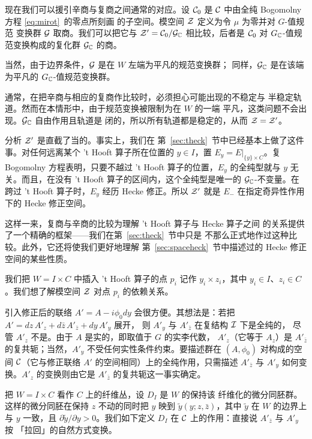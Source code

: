 现在我们可以援引辛商与复商之间通常的对应。设 ${\EUC}_0$ 是
${\EUC}$ 中由全纯 Bogomolny 方程 \eqref{eq:mirot}\ 的零点所刻画
的子空间。模空间 ${\EUZ}$ 定义为令 $\mu$ 为零并对 $G$-值规范
变换群 ${\cal G}$ 取商。我们可以把它与
${\EUZ}'={\EUC}_0/{\cal G}_{\Bbb{C}}$ 相比较，后者是 ${\EUC}_0$
对 $G_{\Bbb{C}}$-值规范变换构成的复化群
${\cal G}_{\Bbb{C}}$ 的商。

当然，由于边界条件，${\cal G}$ 是在 $W$ 左端为平凡的规范变换群；
同样，${\cal G}_{\Bbb{C}}$ 是在该端为平凡的
$G_{\Bbb{C}}$-值规范变换群。

通常，在把辛商与相应的复商作比较时，必须担心可能出现的不稳定与
半稳定轨道。然而在本情形中，由于规范变换被限制为在 $W$ 的一端
平凡，这类问题不会出现。${\cal G}_{\Bbb{C}}$ 自由作用且轨道是
闭的，所以所有轨道都是稳定的，从而 ${\EUZ}={\EUZ}'$。

分析 ${\EUZ}'$ 是直截了当的。事实上，我们在
第~\ref{sec:theck}~节中已经基本上做了这件事。对任何远离某个
't Hooft 算子所在位置的 $y\in I$，置
$E_y=E|_{ \{y\}\times C}$。复 Bogomolny 方程表明，只要不越过
't Hooft 算子的位置，$E_y$ 的全纯型就与 $y$ 无关。而且，在没有
't Hooft 算子的区间内，这个全纯型是唯一的
${\cal G}_{\Bbb{C}}$-不变量。在跨过 't Hooft 算子时，$E_y$ 经历
Hecke 修正。所以 ${\EUZ}'$ 就是 $E_-$ 在指定奇异性作用下的
Hecke 修正空间。

这样一来，复商与辛商的比较为理解 't Hooft 算子与 Hecke 算子之间
的关系提供了一个精确的框架——我们在第~\ref{sec:theck}~节中只是
不那么正式地作过这种比较。此外，它还将使我们更好地理解
第~\ref{sec:spaceheck}~节中描述过的 Hecke 修正空间的某些性质。

\par{}

我们把 $W=I\times C$ 中插入 't Hooft 算子的点 $p_i$ 记作
$y_i\times z_i$，其中 $y_i\in I$、$z_i\in C$。我们想了解模空间
${\EUZ}$ 对点 $p_i$ 的依赖关系。

引入修正后的联络 $A'=A-i\phi_0 dy$ 会很方便。其想法是：若把
$A'=dz\,A'_z+d\bar z \,A'_{\bar z} +dy\, A'_y$ 展开，
则 $A'{}_y$ 与 $A'{}_{\bar z}$ 在复结构 ${\cal I}$ 下是全纯的，
尽管 $A'_z$ 不是。由于 $A$ 是实的，即取值于 $G$ 的实李代数，
$A'_z$（它等于 $A_z$）是 $A'_{\bar z}$ 的复共轭；当然，$A'_y$
不受任何实性条件约束。要描述群在 $(A,\phi_0)$ 对构成的空间
${\EUC}$（它与修正联络 $A'$ 的空间相同）上的全纯作用，只需描述
$A'_{\bar z}$ 与 $A'_y$ 如何变换。$A'_z$ 的变换则由它是
$A'_{\bar z}$ 的复共轭这一事实确定。

把 $W=I\times C$ 看作 $C$ 上的纤维丛，设 $D_I$ 是 $W$ 的保持该
纤维化的微分同胚群。这样的微分同胚在保持 $z$ 不动的同时把 $y$
映到 $\tilde y(y;z,\bar z)$，其中 $\tilde y$ 在 $W$ 的边界上与
$y$ 一致，且 $\partial \tilde y/\partial y>0$。我们如下定义
$D_I$ 在 ${\EUC}$ 上的作用：直接说 $A'_{\bar z}$ 与 $A'_y$ 按
「拉回」的自然方式变换。


